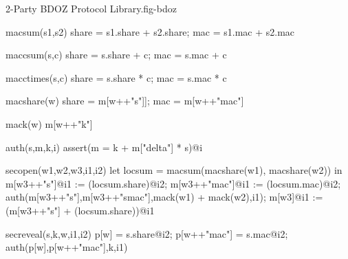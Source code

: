 \begin{fpfig}[t]{2-Party BDOZ Protocol Library.}{fig-bdoz}
{\footnotesize{
  \begin{verbatimtab}
    macsum(s1,s2)
    { { share = s1.share + s2.share; mac = s1.mac + s2.mac } }
    
    maccsum(s,c)
    { { share = s.share + c; mac = s.mac + c } }
    
    macctimes(s,c)
    { { share = s.share * c; mac = s.mac * c } }
    
    macshare(w) { {  share = m[w++"s"]]; mac = m[w++"mac"] } }

    mack(w) { m[w++"k"] }
    
    auth(s,m,k,i) { assert(m = k + m["delta"] * s)@i }
    
    secopen(w1,w2,w3,i1,i2)
    {
      let locsum =  macsum(macshare(w1), macshare(w2)) in
      m[w3++"s"]@i1 := (locsum.share)@i2;
      m[w3++"mac"]@i1 := (locsum.mac)@i2;
      auth(m[w3++"s"],m[w3++"smac"],mack(w1) + mack(w2),i1);
      m[w3]@i1 := (m[w3++"s"] + (locsum.share))@i1
    }

    secreveal(s,k,w,i1,i2)
    {
      p[w] = s.share@i2;
      p[w++"mac"] = s.mac@i2;
      auth(p[w],p[w++"mac"],k,i1)    
    } \end{verbatimtab}
}}
\end{fpfig}


    
